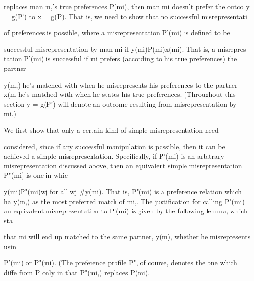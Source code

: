 \documentclass[10pt]{article}
\begin{document}
\begin{ReviewVerbatim}
replaces man m,'s true preferences P(mi), then man mi doesn't prefer the outco
y = g(P') to x = g(P). That is, we need to show that no successful misrepresentati

of preferences is possible, where a misrepresentation P'(mi) is defined to be

successful misrepresentation by man mi if y(mi)P(mi)x(mi). That is, a misrepres
tation P'(mi) is successful if mi prefers (according to his true preferences) the partner

y(m,) he's matched with when he misrepresents his preferences to the partner x(m
he's matched with when he states his true preferences. (Throughout this section
y = g(P') will denote an outcome resulting from misrepresentation by mi.)

We first show that only a certain kind of simple misrepresentation need

considered, since if any successful manipulation is possible, then it can be achieved
a simple misrepresentation. Specifically, if P'(mi) is an arbitrary misrepresentation
discussed above, then an equivalent simple misrepresentation P"(mi) is one in whic

y(mi)P"(mi)wj for all wj #y(mi). That is, P"(mi) is a preference relation which ha
y(m,) as the most preferred match of mi,. The justification for calling P"(mi) an
equivalent misrepresentation to P'(mi) is given by the following lemma, which sta

that mi will end up matched to the same partner, y(m), whether he misrepresents usin

P'(mi) or P"(mi). (The preference profile P", of course, denotes the one which diffe
from P only in that P"(mi,) replaces P(mi).
\end{ReviewVerbatim}
\end{document}
